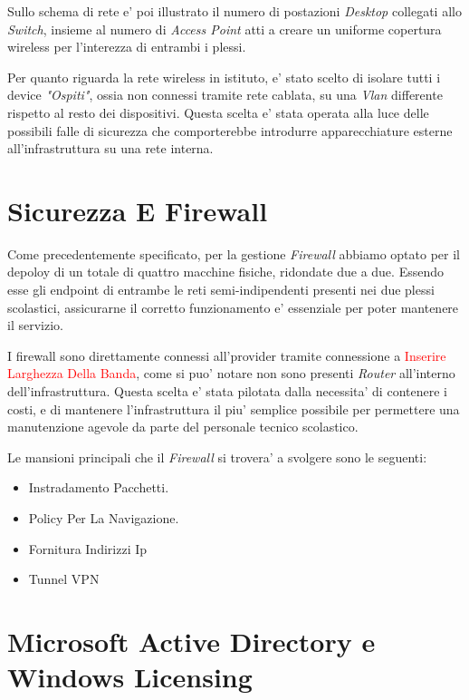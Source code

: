 \documentclass{report}
\begin{document}
\begin{sloppypar}
        Sullo schema di rete e' poi illustrato il numero di postazioni \emph{Desktop} collegati allo \emph{Switch}, 
         insieme al numero di \emph{Access Point} atti a creare un uniforme copertura wireless per l'interezza di
         entrambi i plessi.

        Per quanto riguarda la rete wireless in istituto, e' stato scelto di isolare tutti i device \textit{"Ospiti"}, ossia
         non connessi tramite rete cablata, su una \emph{Vlan} differente rispetto al resto dei dispositivi. Questa scelta 
         e' stata operata alla luce delle possibili falle di sicurezza che comporterebbe introdurre apparecchiature 
         esterne all'infrastruttura su una rete interna.
    \end{sloppypar}
    \chapter{Sicurezza E Firewall}
        \author{Serena Thomas}
        Come precedentemente specificato, per la gestione \emph{Firewall} abbiamo optato per il depoloy di un totale di
         quattro macchine fisiche, ridondate due a due. Essendo esse gli endpoint di entrambe le reti semi-indipendenti 
         presenti nei due plessi scolastici, assicurarne il corretto funzionamento e' essenziale per poter mantenere
         il servizio.
        
        I firewall sono direttamente connessi all'provider tramite connessione a \textcolor{Red}{Inserire Larghezza 
         Della Banda}, come si puo' notare non sono presenti \emph{Router} all'interno dell'infrastruttura. Questa 
         scelta e' stata pilotata dalla necessita' di contenere i costi, e di mantenere l'infrastruttura il piu'
         semplice possibile per permettere una manutenzione agevole da parte del personale tecnico scolastico.

        Le mansioni principali che il \emph{Firewall} si trovera' a svolgere sono le seguenti:
        \begin{itemize}
            \item Instradamento Pacchetti.
            \item Policy Per La Navigazione.
            \item Fornitura Indirizzi Ip
            \item Tunnel VPN
        \end{itemize}
    \chapter{Microsoft Active Directory e Windows Licensing}
        \author{Catone Mario}
\end{document}
